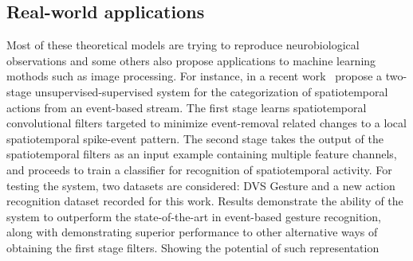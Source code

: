 \documentclass[brainsci, %
               review,submit,pdftex,moreauthors%
               ]{Definitions/mdpi}
\begin{document}







\subsection{Real-world applications}
Most of these theoretical models are trying to reproduce neurobiological observations and some others also propose applications to machine learning mothods such as image processing. For instance, in a recent work~\citet{ghosh_spatiotemporal_2019} propose a two-stage unsupervised-supervised system for the categorization of spatiotemporal actions from an event-based stream. The first stage learns spatiotemporal convolutional filters targeted to minimize event-removal related changes to a local spatiotemporal spike-event pattern. The second stage takes the output of the spatiotemporal filters as an input example containing multiple feature channels, and proceeds to train a classifier for recognition of spatiotemporal activity. For testing the system, two datasets are considered: DVS Gesture and a new action recognition dataset recorded for this work. Results demonstrate the ability of the system to outperform the state-of-the-art in event-based gesture recognition, along with demonstrating superior performance to other alternative ways of obtaining the first stage filters. Showing the potential of such representation
\end{document}
